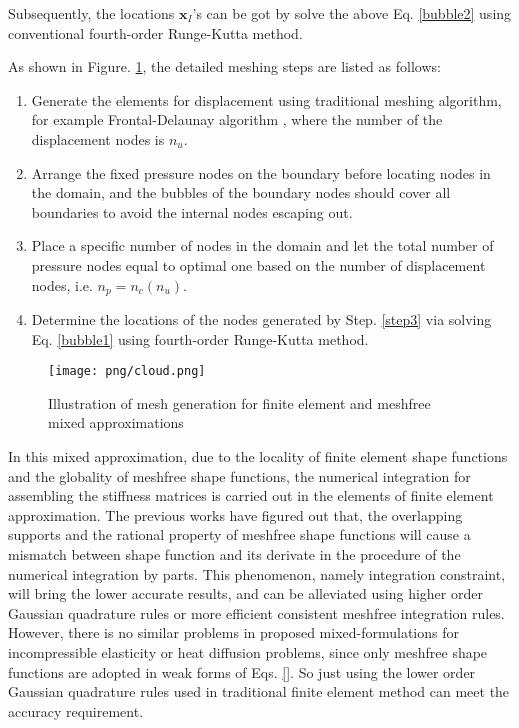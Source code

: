 Subsequently, the locations $\boldsymbol x_I$'s can be got by solve the above Eq. \eqref{bubble2} using conventional fourth-order Runge-Kutta method.

As shown in Figure. \ref{fig:cloud}, the detailed meshing steps are listed as follows: 
\begin{enumerate}
    \item Generate the elements for displacement using traditional meshing algorithm, for example Frontal-Delaunay algorithm \cite{deberg2008}, where the number of the displacement nodes is $n_u$. 
    \item Arrange the fixed pressure nodes on the boundary before locating nodes in the domain, and the bubbles of the boundary nodes should cover all boundaries to avoid the internal nodes escaping out.
    \item Place a specific number of nodes in the domain and let the total number of pressure nodes equal to optimal one based on the number of displacement nodes, i.e. $n_p = n_c(n_u)$. \label{step3}
    \item Determine the locations of the nodes generated by Step. \ref{step3} via solving Eq. \eqref{bubble1} using fourth-order Runge-Kutta method.
\end{enumerate}

\begin{figure}[!ht]
\centering
\texttt{[image: png/cloud.png]}
\caption{Illustration of mesh generation for finite element and meshfree mixed approximations}\label{fig:cloud}
\end{figure}

In this mixed approximation, due to the locality of finite element shape functions and the globality of meshfree shape functions, the numerical integration for assembling the stiffness matrices is carried out in the elements of finite element approximation. 
The previous works have figured out that, the overlapping supports and the rational property of meshfree shape functions will cause a mismatch between shape function and its derivate in the procedure of the numerical integration by parts. This phenomenon, namely integration constraint, will bring the lower accurate results, and can be alleviated using higher order Gaussian quadrature rules or more efficient consistent meshfree integration rules. 
However, there is no similar problems in proposed mixed-formulations for incompressible elasticity or heat diffusion problems, since only meshfree shape functions are adopted in weak forms of Eqs. \eqref{}.
So just using the lower order Gaussian quadrature rules used in traditional finite element method can meet the accuracy requirement.
